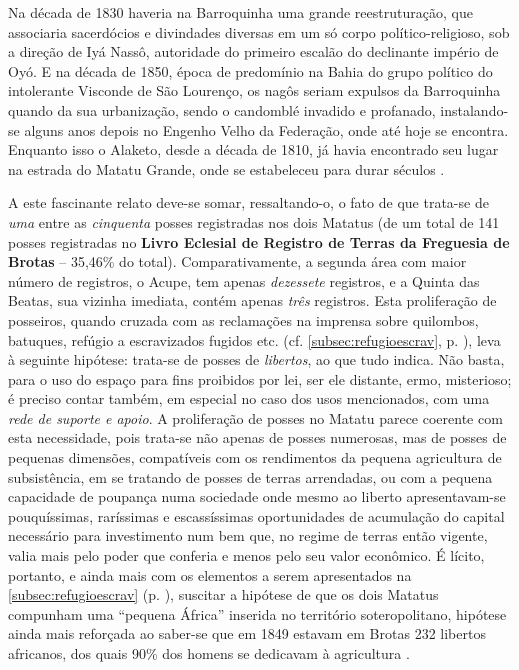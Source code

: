 \begin{citacao}
Na década de 1830 haveria na Barroquinha uma grande reestruturação, que associaria sacerdócios e divindades diversas em um só corpo político-religioso, sob a direção de Iyá Nassô, autoridade do primeiro escalão do declinante império de Oyó. E na década de 1850, época de predomínio na Bahia do grupo político do intolerante Visconde de São Lourenço, os nagôs seriam expulsos da Barroquinha quando da sua urbanização, sendo o candomblé invadido e profanado, instalando-se alguns anos depois no Engenho Velho da Federação, onde até hoje se encontra. Enquanto isso o Alaketo, desde a década de 1810, já havia encontrado seu lugar na estrada do Matatu Grande, onde se estabeleceu para durar séculos \cite[p.~354-356, 369-377]{silveira_alaketo_2003}.
\end{citacao}

A este fascinante relato deve-se somar, ressaltando-o, o fato de que trata-se de \textit{uma} entre as \textit{cinquenta} posses registradas nos dois Matatus (de um total de 141 posses registradas no \textbf{Livro Eclesial de Registro de Terras da Freguesia de Brotas} -- 35,46\% do total). Comparativamente, a segunda área com maior número de registros, o Acupe, tem apenas \textit{dezessete} registros, e a Quinta das Beatas, sua vizinha imediata, contém apenas \textit{três} registros. Esta proliferação de posseiros, quando cruzada com as reclamações na imprensa sobre quilombos, batuques, refúgio a escravizados fugidos etc. (cf. \autoref{subsec:refugioescrav}, p. \pageref{subsec:refugioescrav}), leva à seguinte hipótese: trata-se de posses de \textit{libertos}, ao que tudo indica. Não basta, para o uso do espaço para fins proibidos por lei, ser ele distante, ermo, misterioso; é preciso contar também, em especial no caso dos usos mencionados, com uma \textit{rede de suporte e apoio}. A proliferação de posses no Matatu parece coerente com esta necessidade, pois trata-se não apenas de posses numerosas, mas de posses de pequenas dimensões, compatíveis com os rendimentos da pequena agricultura de subsistência, em se tratando de posses de terras arrendadas, ou com a pequena capacidade de poupança numa sociedade onde mesmo ao liberto apresentavam-se pouquíssimas, raríssimas e escassíssimas oportunidades de acumulação do capital necessário para investimento num bem que, no regime de terras então vigente, valia mais pelo poder que conferia e menos pelo seu valor econômico. É lícito, portanto, e ainda mais com os elementos a serem apresentados na \autoref{subsec:refugioescrav} (p. \pageref{subsec:refugioescrav}), suscitar a hipótese de que os dois Matatus compunham uma ``pequena África'' inserida no território soteropolitano, hipótese ainda mais reforçada ao saber-se que em 1849 estavam em Brotas 232 libertos africanos, dos quais 90\% dos homens se dedicavam à agricultura \cite[p.~151]{COSTA1989}.

